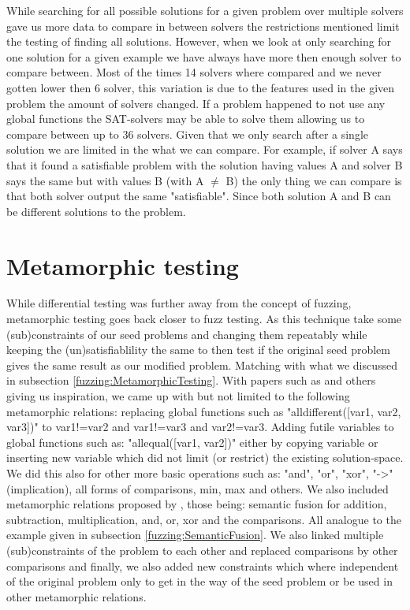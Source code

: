 While searching for all possible solutions for a given problem over multiple solvers gave us more data to compare in between solvers the restrictions mentioned limit the testing of finding all solutions. However, when we look at only searching for one solution for a given example we have always have more then enough solver to compare between. Most of the times 14 solvers where compared and we never gotten lower then 6 solver, this variation is due to the features used in the given problem the amount of solvers changed. If a problem happened to not use any global functions the SAT-solvers may be able to solve them allowing us to compare between up to 36 solvers. Given that we only search after a single solution we are limited in the what we can compare. For example, if solver A says that it found a satisfiable problem with the solution having values A and solver B says the same but with values B (with A $\neq$ B) the only thing we can compare is that both solver output the same "satisfiable". Since both solution A and B can be different solutions to the problem.

\section{Metamorphic testing}
While differential testing was further away from the concept of fuzzing, metamorphic testing goes back closer to fuzz testing. As this technique take some (sub)constraints of our seed problems and changing them repeatably while keeping the (un)satisfiablility the same to then test if the original seed problem gives the same result as our modified problem. Matching with what we discussed in subsection \ref{fuzzing:MetamorphicTesting}. With papers such as \cite{50akgun2018metamorphic, 49usman2020testmc, 43YinYang} and others giving us inspiration, we came up with but not limited to the following metamorphic relations: replacing global functions such as "alldifferent([var1, var2, var3])" to var1!=var2 and var1!=var3 and var2!=var3. Adding futile variables to global functions such as: "allequal([var1, var2])" either by copying variable or inserting new variable which did not limit (or restrict) the existing solution-space. We did this also for other more basic operations such as: "and", "or", "xor", "->" (implication), all forms of comparisons, min, max and others. We also included metamorphic relations proposed by \cite{43YinYang}, those being: semantic fusion for addition, subtraction, multiplication, and, or, xor and the comparisons. All analogue to the example given in subsection \ref{fuzzing:SemanticFusion}. We also linked multiple (sub)constraints of the problem to each other and replaced comparisons by other comparisons and finally, we also added new constraints which where independent of the original problem only to get in the way of the seed problem or be used in other metamorphic relations.

